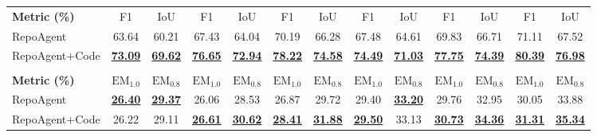 \begin{table}[t]
\begin{tabular}{l|cc|cc|cc|cc|cc|cc}
\rowcolor{myblue} \multicolumn{13}{c}{\textbf{Functionality Localization}} \\ \midrule
\rowcolor{gray!20} \textbf{Metric (\%)} & F1 & IoU & F1 & IoU & F1 & IoU & F1 & IoU & F1 & IoU & F1 & IoU \\ \midrule
RepoAgent & 63.64 & 60.21 & 67.43 & 64.04 & 70.19 & 66.28 & 67.48 & 64.61 & 69.83 & 66.71 & 71.11 & 67.52 \\
RepoAgent+Code & \underline{\textbf{73.09}} & \underline{\textbf{69.62}} & \underline{\textbf{76.65}} & \underline{\textbf{72.94}} & \underline{\textbf{78.22}} & \underline{\textbf{74.58}} & \underline{\textbf{74.49}} & \underline{\textbf{71.03}} & \underline{\textbf{77.75}} & \underline{\textbf{74.39}} & \underline{\textbf{80.39}} & \underline{\textbf{76.98}}\\ \midrule

\rowcolor{mypink} \multicolumn{13}{c}{\textbf{Functionality Completion}} \\ \midrule
\rowcolor{gray!20} \textbf{Metric (\%)} & $\text{EM}_{1.0}$ & $\text{EM}_{0.8}$ & $\text{EM}_{1.0}$ & $\text{EM}_{0.8}$ & $\text{EM}_{1.0}$ & $\text{EM}_{0.8}$ & $\text{EM}_{1.0}$ & $\text{EM}_{0.8}$ & $\text{EM}_{1.0}$ & $\text{EM}_{0.8}$ & $\text{EM}_{1.0}$ & $\text{EM}_{0.8}$ \\
\midrule
RepoAgent & \underline{\textbf{26.40}} & \underline{\textbf{29.37}} & 26.06 & 28.53 & 26.87 & 29.72 & 29.40 & \underline{\textbf{33.20}} & 29.76 & 32.95 & 30.05 & 33.88 \\
RepoAgent+Code  & 26.22 & 29.11 & \underline{\textbf{26.61}} & \underline{\textbf{30.62}} & \underline{\textbf{28.41}} & \underline{\textbf{31.88}} & \underline{\textbf{29.50}} & 33.13 & \underline{\textbf{30.73}} & \underline{\textbf{34.36}} & \underline{\textbf{31.31}} & \underline{\textbf{35.34}}\\
\bottomrule
\end{tabular}
\end{table}